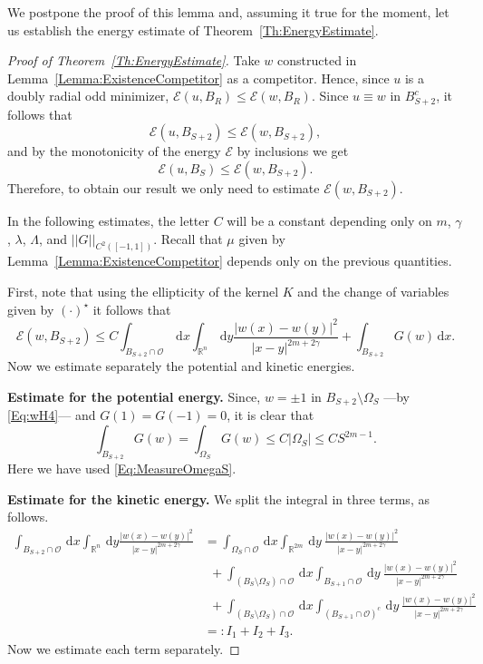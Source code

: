 \documentclass[12pt,reqno]{amsart}
\theoremstyle{definition}
\theoremstyle{remark}
\newcommand{\con}[1]{\mathbb{#1}}
\newcommand{\R}{\con{R}} %
\newcommand{\ecal}{\mathcal{E}}
\newcommand{\ocal}{\mathcal{O}}
\newcommand{\norm}[1]{\left | \left |{#1} \right | \right |}
\newcommand{\s}{\gamma}
\renewcommand{\d}{\,\mathrm{d}} %
\numberwithin{equation}{section}
\begin{document}
We postpone the proof of this lemma and, assuming it true for the moment, let us establish the energy estimate of Theorem~\ref{Th:EnergyEstimate}. 

\begin{proof}[Proof of Theorem~\ref{Th:EnergyEstimate}]
	Take $w$ constructed in Lemma~\ref{Lemma:ExistenceCompetitor} as a competitor. Hence, since $u$ is a doubly radial odd minimizer, $ \ecal (u, B_R) \leq \ecal (w, B_R)$. Since $u\equiv w$ in $B_{S+2}^c$, it follows that
	$$ 
	\ecal (u, B_{S+2}) \leq \ecal (w, B_{S+2}), 
	$$
	and by the monotonicity of the energy $\ecal$ by inclusions we get
	$$ 
	\ecal (u, B_{S}) \leq \ecal (w, B_{S+2}). 
	$$
	Therefore, to obtain our result we only need to estimate $\ecal (w, B_{S+2})$. 
	
	
	In the following estimates, the letter $C$ will be a constant depending only on $m$, $\s$, $\lambda$, $\Lambda$, and $\norm{G}_{C^2([-1,1])}$. Recall that $\mu$ given by Lemma~\ref{Lemma:ExistenceCompetitor} depends only on the previous quantities.
	
	First, note that using the ellipticity of the kernel $K$ and the change of variables given by $(\cdot)^\star$ it follows that
	$$ 
	\ecal(w,B_{S+2}) \leq C \int_{B_{S+2}\cap \ocal} \d x \int_{\R^n} \d y \frac{|w(x)-w(y)|^2}{|x-y|^{2m+2\s}} + \int_{B_{S+2}} G(w) \d x. 
	$$
	Now we estimate separately the potential and kinetic energies.
	
	\medskip
	
	\textbf{Estimate for the potential energy.}
	Since, $w=\pm 1$ in $B_{S+2} \setminus \Omega_S$ ---by \eqref{Eq:wH4}--- and $G(1) = G(-1) = 0$, it is clear that
	$$ 
	\int_{B_{S+2}} G(w) = \int_{\Omega_S} G(w) \leq C |\Omega_S| \leq C S^{2m-1}.
	$$  
	Here we have used \eqref{Eq:MeasureOmegaS}.
	
	\medskip
	
	\textbf{Estimate for the kinetic energy.}
	We split the integral in three terms, as follows.
	\begin{align*}
	\int_{B_{S+2}\cap \ocal} \d x \int_{\R^n} \d y \frac{|w(x)-w(y)|^2}{|x-y|^{2m+2\s}} &= \int_{\Omega_{S}\cap \ocal} \d x \int_{\R^{2m}} \d y \ \frac{|w(x)-w(y)|^2}{|x-y|^{2m+2\s}} \\
	&\ \ + \int_{(B_S\setminus \Omega_S)\cap \ocal} \d x \int_{B_{S+1}\cap \ocal} \d y \ \frac{|w(x)-w(y)|^2}{|x-y|^{2m+2\s}} \\
	&\ \ + \int_{(B_S\setminus \Omega_S)\cap \ocal} \d x \int_{(B_{S+1}\cap \ocal)^c} \d y \ \frac{|w(x)-w(y)|^2}{|x-y|^{2m+2\s}} \\
	&=: I_1+I_2+I_3.
	\end{align*}
	Now we estimate each term separately.
	

\end{proof}
\end{document}
